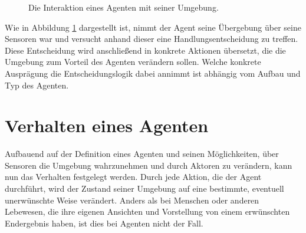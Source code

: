 \begin{figure}[ht!]
	\centering
	\caption{Die Interaktion eines Agenten mit seiner Umgebung.}
	\label{fig:basics:agent}
\end{figure}

Wie in Abbildung \ref{fig:basics:agent} dargestellt ist, nimmt der Agent seine Übergebung über seine Sensoren war und versucht anhand dieser eine Handlungsentscheidung zu treffen. Diese Entscheidung wird anschließend in konkrete Aktionen übersetzt, die die Umgebung zum Vorteil des Agenten verändern sollen.
Welche konkrete Ausprägung die Entscheidungslogik dabei annimmt ist abhängig vom Aufbau und Typ des Agenten. 

\section{Verhalten eines Agenten}
\label{chap:basics:behaviour}

Aufbauend auf der Definition eines Agenten und seinen Möglichkeiten, über Sensoren die Umgebung wahrzunehmen und durch Aktoren zu verändern, kann nun das Verhalten festgelegt werden. Durch jede Aktion, die der Agent durchführt, wird der Zustand seiner Umgebung auf eine bestimmte, eventuell unerwünschte Weise verändert. Anders als bei Menschen oder anderen Lebewesen, die ihre eigenen Ansichten und Vorstellung von einem erwünschten Endergebnis haben, ist dies bei Agenten nicht der Fall.

